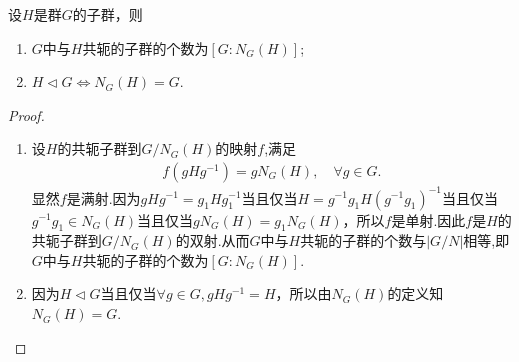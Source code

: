 \documentclass[../../main.tex]{subfiles}%
\begin{document}
\begin{theorem}\label{theorem:共轭子群的个数和正规化子的性质}
设$H$是群$G$的子群，则
\begin{enumerate}[(1)]
\item\label{theorem:共轭子群的个数和正规化子的性质-1} $G$中与$H$共轭的子群的个数为$[G : N_G(H)]$;

\item\label{theorem:共轭子群的个数和正规化子的性质-2} $H \lhd G\iff N_G(H) = G$.
\end{enumerate}
\end{theorem}
\begin{proof}
\begin{enumerate}[(1)]
\item 设$H$的共轭子群到$G/N_G(H)$的映射$f$,满足
\begin{align*}
f(gHg^{-1}) = gN_G(H),\quad \forall g\in G.
\end{align*}
显然$f$是满射.因为$gHg^{-1} = g_1Hg_1^{-1}$当且仅当$H=g^{-1}g_1H(g^{-1}g_1)^{-1}$当且仅当$g^{-1}g_1 \in N_G(H)$当且仅当$gN_G(H)=g_1N_G(H)$，所以$f$是单射.因此$f$是$H$的共轭子群到$G/N_G(H)$的双射.从而$G$中与$H$共轭的子群的个数与$|G/N|$相等,即$G$中与$H$共轭的子群的个数为$[G : N_G(H)]$.

\item 因为$H \lhd G$当且仅当$\forall g \in G, gHg^{-1} = H$，所以由$N_G(H)$的定义知$N_G(H) = G$.
\end{enumerate}

\end{proof}
\end{document}
